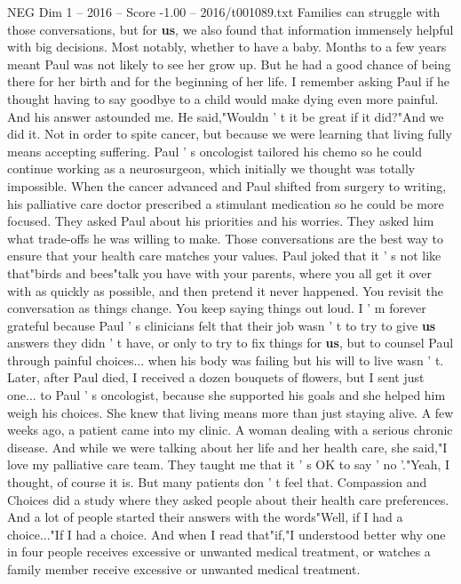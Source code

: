 \begin{textsample}{NEG Dim 1 – 2016 – Score -1.00 – 2016/t001089.txt}
Families can struggle with those conversations, but for \textbf{us}, we also found that information immensely helpful with big decisions.
Most notably, whether to have a baby.
Months to a few years meant Paul was not likely to see her grow up.
But he had a good chance of being there for her birth and for the beginning of her life.
I remember asking Paul if he thought having to say goodbye to a child would make dying even more painful.
And his answer astounded me.
He said,"Wouldn ' t it be great if it did?"And we did it.
Not in order to spite cancer, but because we were learning that living fully means accepting suffering.
Paul ' s oncologist tailored his chemo so he could continue working as a neurosurgeon, which initially we thought was totally impossible.
When the cancer advanced and Paul shifted from surgery to writing, his palliative care doctor prescribed a stimulant medication so he could be more focused.
They asked Paul about his priorities and his worries.
They asked him what trade-offs he was willing to make.
Those conversations are the best way to ensure that your health care matches your values.
Paul joked that it ' s not like that"birds and bees"talk you have with your parents, where you all get it over with as quickly as possible, and then pretend it never happened.
You revisit the conversation as things change.
You keep saying things out loud.
I ' m forever grateful because Paul ' s clinicians felt that their job wasn ' t to try to give \textbf{us} answers they didn ' t have, or only to try to fix things for \textbf{us}, but to counsel Paul through painful choices... when his body was failing but his will to live wasn ' t.
Later, after Paul died, I received a dozen bouquets of flowers, but I sent just one... to Paul ' s oncologist, because she supported his goals and she helped him weigh his choices.
She knew that living means more than just staying alive.
A few weeks ago, a patient came into my clinic.
A woman dealing with a serious chronic disease.
And while we were talking about her life and her health care, she said,"I love my palliative care team.
They taught me that it ' s OK to say ' no '."Yeah, I thought, of course it is.
But many patients don ' t feel that.
Compassion and Choices did a study where they asked people about their health care preferences.
And a lot of people started their answers with the words"Well, if I had a choice..."If I had a choice.
And when I read that"if,"I understood better why one in four people receives excessive or unwanted medical treatment, or watches a family member receive excessive or unwanted medical treatment.

\end{textsample}
